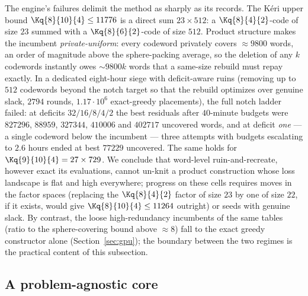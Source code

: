 The engine's failures delimit the method as sharply as its records. The
K\'eri upper bound $\Kq{8}{10}{4}\le 11776$ is a direct sum
$23\times 512$: a $\Kq{8}{4}{2}$-code of size $23$ summed with a
$\Kq{8}{6}{2}$-code of size $512$. Product structure makes the incumbent
\emph{private-uniform}: every codeword privately covers $\approx 9800$
words, an order of magnitude above the sphere-packing average, so the
deletion of any $k$ codewords instantly owes $\sim 9800k$ words that a
same-size rebuild must repay exactly. In a dedicated eight-hour siege
with deficit-aware ruins (removing up to $512$ codewords beyond the
notch target so that the rebuild optimizes over genuine slack, $2794$
rounds, $1.17\cdot 10^6$ exact-greedy placements), the full notch ladder
failed: at deficits $32/16/8/4/2$ the best residuals after $40$-minute
budgets were $827296$, $88959$, $327344$, $410006$ and $402717$ uncovered
words, and at deficit \emph{one} --- a single codeword below the
incumbent --- three attempts with budgets escalating to $2.6$ hours ended
at best $77229$ uncovered.
The same holds for $\Kq{9}{10}{4}=27\times 729$. We conclude that
word-level ruin-and-recreate, however exact its evaluations, cannot
un-knit a product construction whose loss landscape is flat and high
everywhere; progress on these cells requires moves in the factor spaces
(replacing the $\Kq{8}{4}{2}$ factor of size $23$ by one of size $22$,
if it exists, would give $\Kq{8}{10}{4}\le 11264$ outright) or seeds
with genuine slack. By contrast, the loose high-redundancy incumbents
of the same tables (ratio to the sphere-covering bound above
$\approx 8$) fall to the exact greedy constructor alone
(Section~\ref{sec:gpu}); the boundary between the two regimes is the
practical content of this subsection.

\subsection{A problem-agnostic core}\label{sec:gpu:framework}

